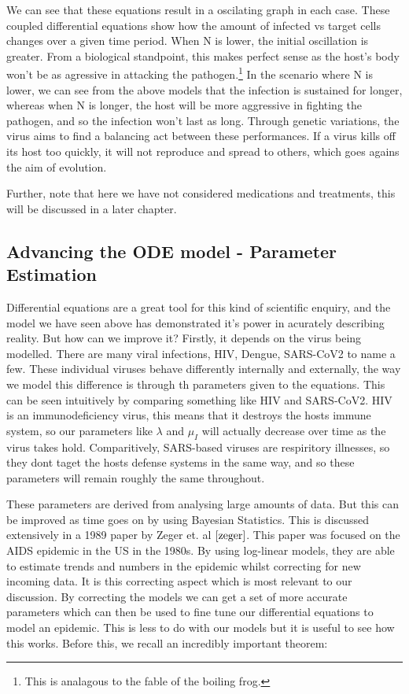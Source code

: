 We can see that these equations result in a oscilating graph in each case. These coupled differential equations show how the amount of infected vs target cells changes over a given time period. When N is lower, the initial oscillation is greater. From a biological standpoint, this makes perfect sense as the host's body won't be as agressive in attacking the pathogen.\footnote{This is analagous to the fable of the boiling frog.} In the scenario where N is lower, we can see from the above models that the infection is sustained for longer, whereas when N is longer, the host will be more aggressive in fighting the pathogen, and so the infection won't last as long. Through genetic variations, the virus aims to find a balancing act between these performances. If a virus kills off its host too quickly, it will not reproduce and spread to others, which goes agains the aim of evolution.

Further, note that here we have not considered medications and treatments, this will be discussed in a later chapter.

\subsection{Advancing the ODE model - Parameter Estimation}

Differential equations are a great tool for this kind of scientific enquiry, and the model we have seen above has demonstrated it's power in acurately describing reality. But how can we improve it? Firstly, it depends on the virus being modelled. There are many viral infections, HIV, Dengue, SARS-CoV2 to name a few. These individual viruses behave differently internally and externally, the way we model this difference is through th parameters given to the equations. This can be seen intuitively by comparing something like HIV and SARS-CoV2. HIV is an immunodeficiency virus, this means that it destroys the hosts immune system, so our parameters like $\lambda$ and  $\mu_I$ will actually decrease over time as the virus takes hold. Comparitively, SARS-based viruses are respiritory illnesses, so they dont taget the hosts defense systems in the same way, and so these parameters will remain roughly the same throughout.

These parameters are derived from analysing large amounts of data. But this can be improved as time goes on by using Bayesian Statistics. This is discussed extensively in a 1989 paper by Zeger et. al $\cite{zeger}$. This paper was focused on the AIDS epidemic in the US in the 1980s. By using log-linear models, they are able to estimate trends and numbers in the epidemic whilst correcting for new incoming data. It is this correcting aspect which is most relevant to our discussion. By correcting the models we can get a set of more accurate parameters which can then be used to fine tune our differential equations to model an epidemic. This is less to do with our models but it is useful to see how this works. Before this, we recall an incredibly important theorem:

